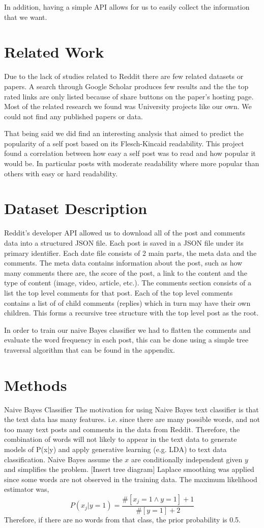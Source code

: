 \documentclass[11pt,twocolumn]{article}
\begin{document}
In addition, having a simple API allows for us to easily collect the information that we want. 

\section{Related Work}
Due to the lack of studies related to Reddit there are few related datasets or papers. A search through Google Scholar produces few results and the the top rated links are only listed because of share buttons on the paper's hosting page. Most of the related research we found was University projects like our own. We could not find any published papers or data.

That being said we did find an interesting analysis that aimed to predict the popularity of a self post based on its Flesch-Kincaid readability. This project found a correlation between how easy a self post was to read and how popular it would be. In particular posts with moderate readability where more popular than others with easy or hard readability.

\section{Dataset Description}

Reddit's developer API allowed us to download all of the post and comments data into a structured JSON file. Each post is saved in a JSON file under its primary identifier. Each date file consists of 2 main parts, the meta data and the comments. The meta data contains information about the post, such as how many comments there are, the score of the post, a link to the content and the type of content (image, video, article, etc.). The comments section consists of a list the top level comments for that post. Each of the top level comments contains a list of of child comments (replies) which in turn may have their own children. This forms a recursive tree structure with the top level post as the root. 

In order to train our naive Bayes classifier we had to flatten the comments and evaluate the word frequency in each post, this can be done using a simple tree traversal algorithm that can be found in the appendix. 

\section{Methods}
Naive Bayes Classifier
The motivation for using Naive Bayes text classifier is that the text data has many features. i.e. since there are many possible words, and not too many text posts and comments in the data from Reddit. Therefore, the combination of words will not likely to appear in the text data to generate models of P(x|y) and apply generative learning (e.g. LDA) to text data classification.
Naive Bayes assume the $x$ are conditionally independent given $y$ and simplifies the problem.
[Insert tree diagram]
Laplace smoothing was applied since some words are not observed in the training data. The maximum likelihood estimator was,
\[
P(x_j|y=1) = \frac {\#[x_j=1 \land y=1]+1}{\#[y=1]+2}
\]
Therefore, if there are no words from that class, the prior probability is 0.5.
\end{document}
